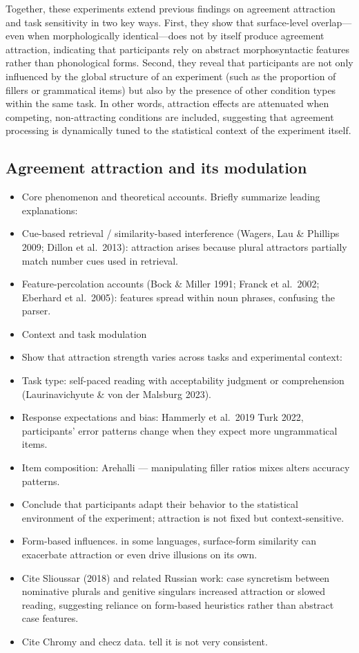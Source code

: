 \documentclass[
  authoryear,
  preprint]{elsarticle}
\begin{document}
Together, these experiments extend previous findings on agreement
attraction and task sensitivity in two key ways. First, they show that
surface-level overlap---even when morphologically identical---does not
by itself produce agreement attraction, indicating that participants
rely on abstract morphosyntactic features rather than phonological
forms. Second, they reveal that participants are not only influenced by
the global structure of an experiment (such as the proportion of fillers
or grammatical items) but also by the presence of other condition types
within the same task. In other words, attraction effects are attenuated
when competing, non-attracting conditions are included, suggesting that
agreement processing is dynamically tuned to the statistical context of
the experiment itself.

\subsection{Agreement attraction and its
modulation}\label{agreement-attraction-and-its-modulation}

\begin{itemize}
\item
  Core phenomenon and theoretical accounts. Briefly summarize leading
  explanations:
\item
  Cue-based retrieval / similarity-based interference (Wagers, Lau \&
  Phillips 2009; Dillon et al.~2013): attraction arises because plural
  attractors partially match number cues used in retrieval.
\item
  Feature-percolation accounts (Bock \& Miller 1991; Franck et al.~2002;
  Eberhard et al.~2005): features spread within noun phrases, confusing
  the parser.
\item
  Context and task modulation
\item
  Show that attraction strength varies across tasks and experimental
  context:
\item
  Task type: self-paced reading with acceptability judgment or
  comprehension (Laurinavichyute \& von der Malsburg 2023).
\item
  Response expectations and bias: Hammerly et al.~2019 Turk 2022,
  participants' error patterns change when they expect more
  ungrammatical items.
\item
  Item composition: Arehalli --- manipulating filler ratios mixes alters
  accuracy patterns.
\item
  Conclude that participants adapt their behavior to the statistical
  environment of the experiment; attraction is not fixed but
  context-sensitive.
\item
  Form-based influences. in some languages, surface-form similarity can
  exacerbate attraction or even drive illusions on its own.
\item
  Cite Slioussar (2018) and related Russian work: case syncretism
  between nominative plurals and genitive singulars increased attraction
  or slowed reading, suggesting reliance on form-based heuristics rather
  than abstract case features.
\item
  Cite Chromy and checz data. tell it is not very consistent.
\end{itemize}
\end{document}
